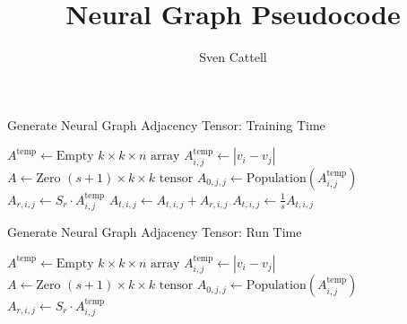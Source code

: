 \documentclass{article}
\title{Neural Graph Pseudocode}
\author{Sven Cattell}
\begin{document}
\begin{algorithm}
\caption{Generate Neural Graph Adjacency Tensor: Training Time}\label{training}
\begin{algorithmic}[1]

\State $A^{\text{temp}} \gets \text{Empty } k \times k \times n \text{ array}$
\State $A_{i,j}^{\text{temp}} \gets |v_i - v_j|$
\EndFor
\EndFor
\EndProcedure
{}
\State $A \gets \text{Zero } (s+1) \times k \times k \text{ tensor}$
\State $A_{0,j,j} \gets \text{Population}(A_{i,j}^{\text{temp}}) $
\State $A_{r,i,j} \gets S_r \cdot A_{i,j}^{\text{temp}}$
\State $A_{t,i,j} \gets A_{t,i,j} + A_{r,i,j}$
\EndIf
\EndFor
\State $A_{t,i,j} \gets \frac{1}{s}A_{t,i,j}$
\EndFor
\EndFor
\EndProcedure
{}
\end{algorithmic}
\end{algorithm}

\begin{algorithm}
\caption{Generate Neural Graph Adjacency Tensor: Run Time}\label{run}
\begin{algorithmic}[1]

\State $A^{\text{temp}} \gets \text{Empty } k \times k \times n \text{ array}$
\State $A_{i,j}^{\text{temp}} \gets |v_i - v_j|$
\EndFor
\EndFor
\EndProcedure
{}
\State $A \gets \text{Zero } (s+1) \times k \times k \text{ tensor}$
\State $A_{0,j,j} \gets \text{Population}(A_{i,j}^{\text{temp}}) $
\State $A_{r,i,j} \gets S_r \cdot A_{i,j}^{\text{temp}}$
\EndFor
\EndFor
\EndFor
\EndProcedure
{}
\end{algorithmic}
\end{algorithm}
\end{document}
